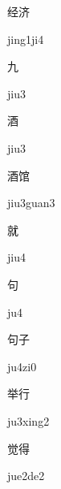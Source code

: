 \begin{multicols*}{2}
\begin{verbete}[jing1ji4]{经济}
\begin{pronuncia}{jing1ji4}
\end{pronuncia}
\end{verbete}

\begin{verbete}[jiu3]{九}
\begin{pronuncia}{jiu3}
\end{pronuncia}
\end{verbete}

\begin{verbete}[jiu3]{酒}
\begin{pronuncia}{jiu3}
\end{pronuncia}
\end{verbete}

\begin{verbete}{酒馆}
\begin{pronuncia}{jiu3guan3}
\end{pronuncia}
\end{verbete}

\begin{verbete}[jiu4]{就}
\begin{pronuncia}{jiu4}
\end{pronuncia}
\end{verbete}

\begin{verbete}[ju4]{句}
\begin{pronuncia}{ju4}
\end{pronuncia}
\end{verbete}

\begin{verbete}[ju4zi0]{句子}
\begin{pronuncia}{ju4zi0}
\end{pronuncia}
\end{verbete}

\begin{verbete}[ju3xing2]{举行}
\begin{pronuncia}{ju3xing2}
\end{pronuncia}
\end{verbete}

\begin{verbete}[jue2de2]{觉得}
\begin{pronuncia}{jue2de2}
\end{pronuncia}
\end{verbete}

\end{multicols*}
